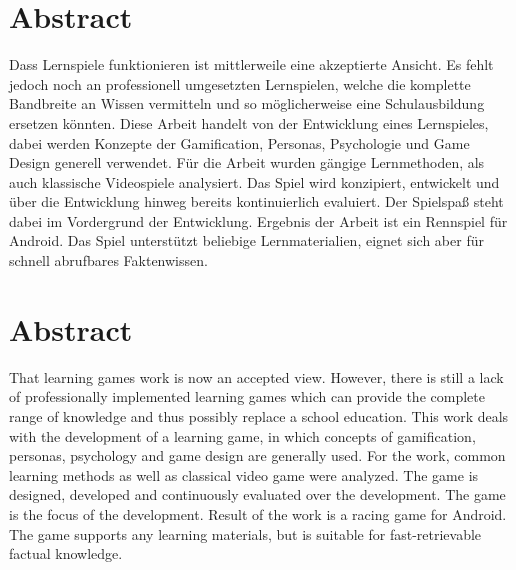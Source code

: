 \section*{Abstract}
Dass Lernspiele funktionieren ist mittlerweile eine akzeptierte Ansicht. Es fehlt jedoch noch an professionell umgesetzten Lernspielen, welche die komplette Bandbreite an Wissen vermitteln und so möglicherweise eine Schulausbildung ersetzen könnten.
Diese Arbeit handelt von der Entwicklung eines Lernspieles, dabei werden Konzepte der Gamification, Personas, Psychologie und Game Design generell verwendet. Für die Arbeit wurden gängige Lernmethoden, als auch klassische Videospiele analysiert. Das Spiel wird konzipiert, entwickelt und über die Entwicklung hinweg bereits kontinuierlich evaluiert. Der Spielspaß steht dabei im Vordergrund der Entwicklung.
Ergebnis der Arbeit ist ein Rennspiel für Android. Das Spiel unterstützt beliebige Lernmaterialien, eignet sich aber für schnell abrufbares Faktenwissen.

\vfill

\section*{Abstract}
That learning games work is now an accepted view. However, there is still a lack of professionally implemented learning games which can provide the complete range of knowledge and thus possibly replace a school education.
This work deals with the development of a learning game, in which concepts of gamification, personas, psychology and game design are generally used. For the work, common learning methods as well as classical video game were analyzed. The game is designed, developed and continuously evaluated over the development. The game is the focus of the development.
Result of the work is a racing game for Android. The game supports any learning materials, but is suitable for fast-retrievable factual knowledge.

\vfill\newpage
